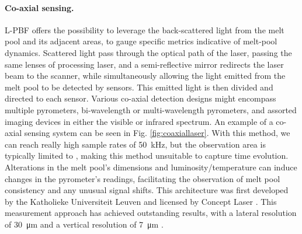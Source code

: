 \paragraph{Co-axial sensing.} L-PBF offers the possibility to leverage the back-scattered light from the melt pool and its adjacent areas, to gauge specific metrics indicative of melt-pool dynamics. Scattered light pass through the optical path of the laser, passing the same lenses of processing laser, and a semi-reflective mirror redirects the laser beam to the scanner, while simultaneously allowing the light emitted from the melt pool to be detected by sensors. This emitted light is then divided and directed to each sensor. Various co-axial detection designs might encompass multiple pyrometers, bi-wavelength or multi-wavelength pyrometers, and assorted imaging devices in either the visible or infrared spectrum. An example of a co-axial sensing system can be seen in Fig. \ref{fig:coaxiallaser}. With this method, we can reach really high sample rates of \SI{50}{\kilo\hertz}, but the observation area is typically limited to , making this method unsuitable to capture time evolution. Alterations in the melt pool's dimensions and luminosity/temperature can induce changes in the pyrometer's readings, facilitating the observation of melt pool consistency and any unusual signal shifts. This architecture was first developed by the Katholieke Universiteit Leuven and licensed by Concept Laser \cite{leach_-machine_2020, kruth_jean-pierre_feedback_2007, berumen_quality_2010}. This measurement approach has achieved outstanding results, with a lateral resolution of \SI{30}{\micro\metre} and a vertical resolution of \SI{7}{\micro\metre} \cite{fleming_tracking_2020}.
